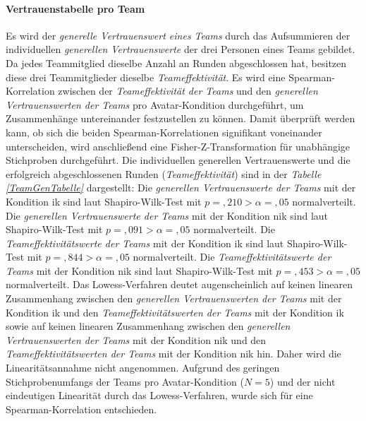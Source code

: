 \documentclass[a4paper,11pt]{article}%
\renewcommand{\\}{\vspace*{0.5\baselineskip} \newline}
\begin{document}
{\paragraph{Vertrauenstabelle pro Team}
Es wird der \textit{generelle Vertrauenswert eines Teams} durch das Aufsummieren der individuellen \textit{generellen Vertrauenswerte} der drei Personen eines Teams gebildet.
Da jedes Teammitglied dieselbe Anzahl an Runden abgeschlossen hat, besitzen diese drei Teammitglieder dieselbe \textit{Teameffektivität}.
Es wird eine Spearman-Korrelation zwischen der \textit{Teameffektivität der Teams} und den \textit{generellen Vertrauenswerten der Teams} pro Avatar-Kondition durchgeführt, um Zusammenhänge untereinander festzustellen zu können.
Damit überprüft werden kann, ob sich die beiden Spearman-Korrelationen signifikant voneinander unterscheiden, wird anschließend eine Fisher-Z-Transformation für unabhängige Stichproben durchgeführt. Die individuellen generellen Vertrauenswerte und die erfolgreich abgeschlossenen Runden (\textit{Teameffektivität}) sind in der \textit{Tabelle \ref{TeamGenTabelle}} dargestellt:\\
Die \textit{generellen Vertrauenswerte der Teams} mit der Kondition \ac{ik} sind laut Shapiro-Wilk-Test mit $p =,210 > \alpha = ,05$ normalverteilt. \newline
Die \textit{generellen Vertrauenswerte der Teams} mit der Kondition \ac{nik} sind laut Shapiro-Wilk-Test mit $p =,091 > \alpha = ,05$ normalverteilt. \newline
Die \textit{Teameffektivitätswerte der Teams} mit der Kondition \ac{ik} sind laut Shapiro-Wilk-Test mit $p =,844 > \alpha = ,05$ normalverteilt. \newline
Die \textit{Teameffektivitätswerte der Teams} mit der Kondition \ac{nik} sind laut Shapiro-Wilk-Test mit $p =,453 > \alpha = ,05$ normalverteilt. \\
Das Lowess-Verfahren deutet augenscheinlich auf keinen linearen Zusammenhang zwischen den \textit{generellen Vertrauenswerten der Teams} mit der Kondition \ac{ik} und den \textit{Teameffektivitätswerten der Teams} mit der Kondition \ac{ik} sowie auf keinen linearen Zusammenhang zwischen den \textit{generellen Vertrauenswerten der Teams} mit der Kondition \ac{nik} und den \textit{Teameffektivitätswerten der Teams} mit der Kondition \ac{nik} hin. Daher wird die Linearitätsannahme nicht angenommen.\\
Aufgrund des geringen Stichprobenumfangs der Teams pro Avatar-Kondition ($N=5$) und der nicht eindeutigen Linearität durch das Lowess-Verfahren, wurde sich für eine Spearman-Korrelation entschieden.
}
\end{document}
